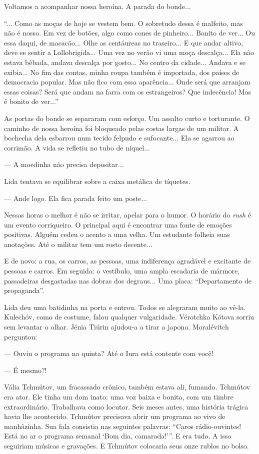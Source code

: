 Voltamos a acompanhar nossa heroína. A parada do bonde...

``... Como as moças de hoje se vestem bem. O sobretudo dessa é malfeito,
mas não é nosso. Em vez de botões, algo como cones de pinheiro... Bonito
de ver... Ou essa daqui, de macacão... Olhe as centáureas no traseiro...
E que andar altivo, deve se sentir a Lollobrigida... Uma vez no verão vi
uma moça descalça... Ela não estava bêbada, andava descalça por gosto...
No centro da cidade... Andava e se exibia... No fim das contas, minha
roupa também é importada, dos países de democracia popular. Mas não fico
com essa aparência... Onde será que arranjam essas coisas? Será que
andam na farra com os estrangeiros? Que indecência! Mas é bonito de
ver...''

As portas do bonde se separaram com esforço. Um assalto curto e
torturante. O caminho de nossa heroína foi bloqueado pelas costas largas
de um militar. A bochecha dela esbarrou num tecido felpudo e
sufocante... Ela se agarrou ao corrimão. A vida se refletiu no tubo de
níquel...

--- A moedinha não precisa depositar...

Lida tentava se equilibrar sobre a caixa metálica de tíquetes.

--- Ande logo. Ela fica parada feito um poste...

Nessas horas o melhor é não se irritar, apelar para o humor. O horário
do \emph{rush} é um evento corriqueiro. O principal aqui é encontrar uma
fonte de emoções positivas. Alguém cedeu o acento a uma velha. Um
estudante folheia suas anotações. Até o militar tem um rosto decente...

E de novo: a rua, os carros, as pessoas, uma indiferença agradável e
excitante de pessoas e carros. Em seguida: o vestíbulo, uma ampla
escadaria de mármore, passadeiras desgastadas nas dobras dos degraus...
Uma placa: ``Departamento de propaganda''.

Lida deu uma batidinha na porta e entrou. Todos se alegraram muito ao
vê-la. Kulechóv, como de costume, falou qualquer vulgaridade. Vérotchka
Kótova sorriu sem levantar o olhar. Jénia Tiúrin ajudou-a a tirar a
japona. Moralévitch perguntou:

--- Ouviu o programa na quinta? Até o Iura está contente com você!

--- É mesmo?!

Vália Tchmútov, um fracassado crônico, também estava ali, fumando.
Tchmútov era ator. Ele tinha um dom inato: uma voz baixa e bonita, com
um timbre extraordinário. Trabalhava como locutor. Seis meses antes, uma
história trágica havia lhe acontecido. Tchmútov precisava abrir um
programa ao vivo de manhãzinha. Sua fala consistia nas seguintes
palavras: ``Caros rádio-ouvintes! Está no ar o programa semanal `Bom
dia\emph{,} camarada!'''. E era tudo. A isso seguiriam músicas e
gravações. E Tchmútov colocaria seus onze rublos no bolso.

